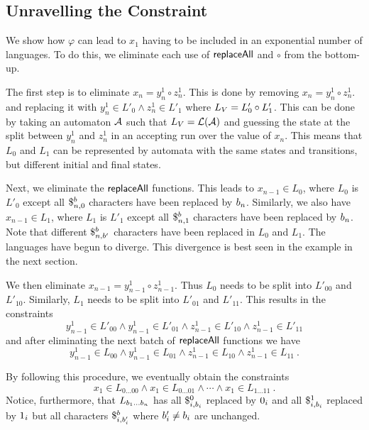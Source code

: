 \documentclass{article}
\newcommand{\concat} {\circ}
\begin{document}
\subsection{Unravelling the Constraint}

We show how $\varphi$ can lead to $x_1$ having to be included in an exponential number of languages.
To do this, we eliminate each use of $\replaceall$ and $\concat$ from the bottom-up.

The first step is to eliminate
$x_n = y^1_n \concat z^1_n$.
This is done by removing
$x_n = y^1_n \concat z^1_n$.
and replacing it with
$y^1_n \in L'_{0} \land z^1_n \in L'_{1}$
where $L_\vcons = L'_{0} \concat L'_{1}$.
This can be done by taking an automaton $\cA$ such that $L_\vcons = \lang{\cA}$ and guessing the state at the split between $y^1_n$ and $z^1_n$ in an accepting run over the value of $x_n$.
This means that $L_{0}$ and $L_{1}$ can be represented by automata with the same states and transitions, but different initial and final states.

Next, we eliminate the $\replaceall$ functions.
This leads to $x_{n-1} \in L_{0}$, where $L_{0}$ is $L'_{0}$ except all $\repl{n}{0}{\bit}$ characters have been replaced by $\nbit{n}{\bit}$.
Similarly, we also have $x_{n-1} \in L_{1}$, where $L_{1}$ is $L'_{1}$ except all $\repl{n}{1}{\bit}$ characters have been replaced by $\nbit{n}{\bit}$.
Note that different $\repl{n}{\bit'}{\bit}$ characters have been replaced in $L_{0}$ and $L_{1}$.
The languages have begun to diverge.
This divergence is best seen in the example in the next section.

We then eliminate
$x_{n-1} = y^1_{n-1} \concat z^1_{n-1}$.
Thus $L_{0}$ needs to be split into $L'_{00}$ and $L'_{10}$.
Similarly, $L_{1}$ needs to be split into $L'_{01}$ and $L'_{11}$.
This results in the constraints
\[
    y^1_{n-1} \in L'_{00} \land
    y^1_{n-1} \in L'_{01} \land
    z^1_{n-1} \in L'_{10} \land
    z^1_{n-1} \in L'_{11}
\]
and after eliminating the next batch of $\replaceall$ functions we have
\[
    y^1_{n-1} \in L_{00} \land
    y^1_{n-1} \in L_{01} \land
    z^1_{n-1} \in L_{10} \land
    z^1_{n-1} \in L_{11} \ .
\]

By following this procedure, we eventually obtain the constraints
\[
    x_1 \in L_{0\ldots00} \land
    x_1 \in L_{0\ldots01} \land
    \cdots \land
    x_1 \in L_{1\ldots11} \ .
\]
Notice, furthermore, that
$L_{\bit_1 \ldots \bit_n}$
has all
$\repl{i}{\bit_i}{0}$
replaced by $\nbit{i}{0}$
and all
$\repl{i}{\bit_i}{1}$
replaced by $\nbit{i}{1}$
but all characters
$\repl{i}{\bit'_i}{\bit}$
where
$\bit'_i \neq \bit_i$
are unchanged.
\end{document}
